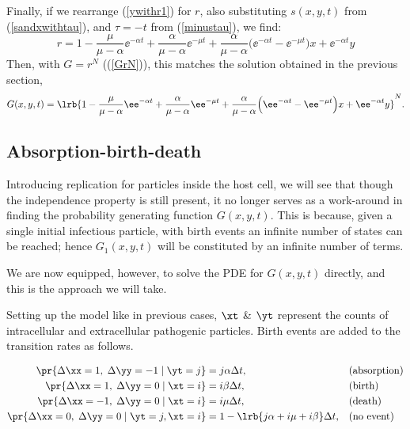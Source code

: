 \vspace{15pt}
\noindent
Finally, if we rearrange (\ref{ywithr1}) for $r$, also substituting $s(x,y,t)$ from (\ref{sandxwithtau}), and $\tau = -t$ from (\ref{minustau}), we find:
\begin{equation*}
r = 1-\frac{\mu}{\mu - \alpha}  \ee^{-\alpha t}  + \frac{\alpha}{\mu - \alpha} \ee^{-\mu t}  + \frac{\alpha}{\mu - \alpha} \Big(   \ee^{-\alpha t} - \ee^{-\mu t} \Big)x +  \ee^{-\alpha t} y
\end{equation*}
Then, with $G = r^N$ ((\ref{GrN})), this matches the solution obtained in the previous section,
\begin{equation*}
G(x,y,t) = \lrb{1-\frac{\mu}{\mu - \alpha}  \ee^{-\alpha t}  + \frac{\alpha}{\mu - \alpha} \ee^{-\mu t}  + \frac{\alpha}{\mu - \alpha} \Big(   \ee^{-\alpha t} - \ee^{-\mu t} \Big)x +  \ee^{-\alpha t} y}^N.
\end{equation*}



\subsection{Absorption-birth-death}

Introducing replication for particles inside the host cell, we will see that though the independence property is still present, it no longer serves as a work-around in finding the probability generating function $G(x,y,t)$. This is because, given a single initial infectious particle, with birth events an infinite number of states can be reached; hence $G_1(x,y,t)$ will be constituted by an infinite number of terms.\par

We are now equipped, however, to solve the PDE for $G(x,y,t)$ directly, and this is the approach we will take.\par

Setting up the model like in previous cases, $\xt$ \& $\yt$ represent the counts of intracellular and extracellular pathogenic particles. Birth events are added to the transition rates as follows.

\begin{align*}
     \pr{\Delta\xx= 1,\;\Delta\yy = -1 \;|\; \yt = j} &= j \alpha \Delta t,  &&\text{(absorption)}\\
     \pr{\Delta\xx= 1,\;\Delta\yy = 0 \;|\; \xt = i} &= i \beta \Delta t,  &&\text{(birth)}\\
      \pr{\Delta\xx= -1,\;\Delta\yy = 0 \;|\; \xt = i} &= i \mu \Delta t,  &&\text{(death)}\\
     \pr{\Delta\xx= 0,\;\Delta\yy = 0 \;|\; \yt = j, \xt=i} &= 1 -  \lrb{ j\alpha + i\mu + i\beta}\Delta t,  &&\text{(no event)}
\label{probSpec1}
\end{align*}

